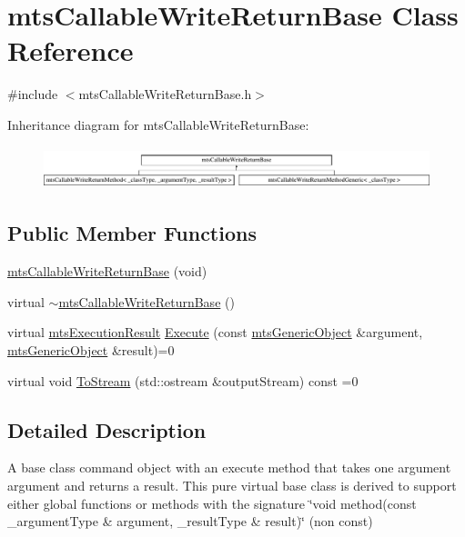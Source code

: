 \hypertarget{classmts_callable_write_return_base}{}\section{mts\+Callable\+Write\+Return\+Base Class Reference}
\label{classmts_callable_write_return_base}


{\ttfamily \#include $<$mts\+Callable\+Write\+Return\+Base.\+h$>$}

Inheritance diagram for mts\+Callable\+Write\+Return\+Base\+:\begin{figure}[H]
\begin{center}
\leavevmode
\includegraphics[height=1.241685cm]{dd/de4/classmts_callable_write_return_base}
\end{center}
\end{figure}
\subsection*{Public Member Functions}
\begin{DoxyCompactItemize}
\item 
\hyperlink{classmts_callable_write_return_base_a74a9331e5d5a433d39c57d3230c77cf0}{mts\+Callable\+Write\+Return\+Base} (void)
\item 
virtual \hyperlink{classmts_callable_write_return_base_a98d1e91ce6aa2b01eba517add581227a}{$\sim$mts\+Callable\+Write\+Return\+Base} ()
\item 
virtual \hyperlink{classmts_execution_result}{mts\+Execution\+Result} \hyperlink{classmts_callable_write_return_base_a27af887e0c24f638cc8e21f1bf749065}{Execute} (const \hyperlink{classmts_generic_object}{mts\+Generic\+Object} \&argument, \hyperlink{classmts_generic_object}{mts\+Generic\+Object} \&result)=0
\item 
virtual void \hyperlink{classmts_callable_write_return_base_a56bfb09f0ebff160d2930f1c8521fe0e}{To\+Stream} (std\+::ostream \&output\+Stream) const =0
\end{DoxyCompactItemize}


\subsection{Detailed Description}
A base class command object with an execute method that takes one argument argument and returns a result. This pure virtual base class is derived to support either global functions or methods with the signature \char`\"{}void method(const \+\_\+argument\+Type \& argument,
\+\_\+result\+Type \& result)\char`\"{} (non const) 

